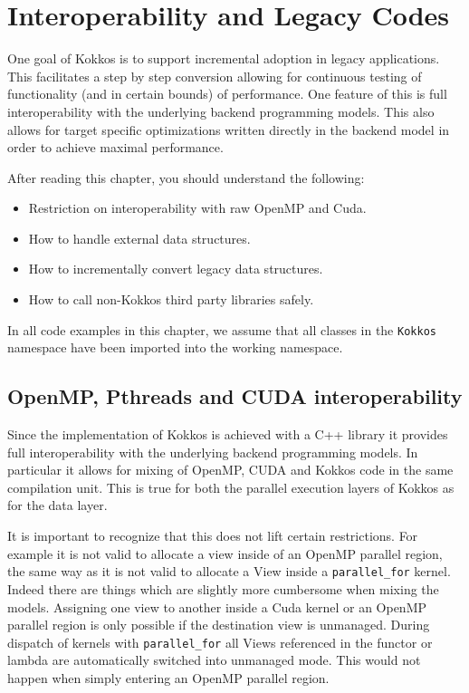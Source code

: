 \chapter{Interoperability and Legacy Codes}

One goal of Kokkos is to support incremental adoption in legacy 
applications. This facilitates a step by step conversion allowing
for continuous testing of functionality (and in certain bounds) of 
performance. One feature of this is full interoperability with the 
underlying backend programming models. This also allows for 
target specific optimizations written directly in the backend model
in order to achieve maximal performance.

After reading this chapter, you should understand the following:
\begin{itemize}
\item Restriction on interoperability with raw OpenMP and Cuda.
\item How to handle external data structures.
\item How to incrementally convert legacy data structures.
\item How to call non-Kokkos third party libraries safely.
\end{itemize}
In all code examples in this chapter, we assume that all classes in
the \lstinline!Kokkos! namespace have been imported into the working
namespace.

\section{OpenMP, Pthreads and CUDA interoperability}

Since the implementation of Kokkos is achieved with a C++ library
it provides full interoperability with the underlying backend programming
models. In particular it allows for mixing of OpenMP, CUDA and Kokkos 
code in the same compilation unit. This is true for both the parallel 
execution layers of Kokkos as for the data layer. 

It is important to recognize that this does not lift certain restrictions. 
For example it is not valid to allocate a view inside of an OpenMP 
parallel region, the same way as it is not valid to allocate a View 
inside a \lstinline|parallel_for| kernel. Indeed there are things which 
are slightly more cumbersome when mixing the models. Assigning 
one view to another inside a Cuda kernel or an OpenMP parallel 
region is only possible if the destination view is unmanaged. 
During dispatch of kernels with \lstinline|parallel_for|  all Views referenced 
in the functor or lambda are automatically switched into unmanaged 
mode. This would not happen when simply entering an OpenMP 
parallel region. 

